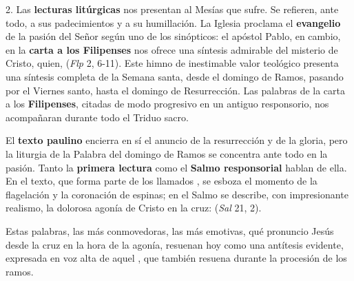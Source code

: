 \begin{body}
2. Las \textbf{lecturas litúrgicas} nos presentan al Mesías que sufre. Se refieren, ante todo, a sus padecimientos y a su humillación. La Iglesia proclama el \textbf{evangelio} de la pasión del Señor según uno de los sinópticos: el apóstol Pablo, en cambio, en la \textbf{carta a los Filipenses} nos ofrece una síntesis admirable del misterio de Cristo, quien,  (\textit{Flp} 2, 6-11). Este himno de inestimable valor teológico presenta una síntesis completa de la Semana santa, desde el domingo de Ramos, pasando por el Viernes santo, hasta el domingo de Resurrección. Las palabras de la carta a los \textbf{Filipenses}, citadas de modo progresivo en un antiguo responsorio, nos acompañaran durante todo el Triduo sacro.

El \textbf{texto paulino} encierra en sí el anuncio de la resurrección y de la gloria, pero la liturgia de la Palabra del domingo de Ramos se concentra ante todo en la pasión. Tanto la \textbf{primera lectura} como el \textbf{Salmo responsorial} hablan de ella. En el texto, que forma parte de los llamados , se esboza el momento de la flagelación y la coronación de espinas; en el Salmo se describe, con impresionante realismo, la dolorosa agonía de Cristo en la cruz:  (\textit{Sal} 21, 2).

Estas palabras, las más conmovedoras, las más emotivas, qué pronuncio Jesús desde la cruz en la hora de la agonía, resuenan hoy como una antítesis evidente, expresada en voz alta de aquel , que también resuena durante la procesión de los ramos.


\end{body}
